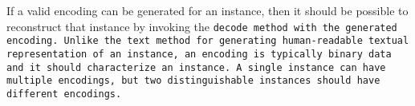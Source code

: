 If a valid encoding can be generated for an instance,
then it should be possible to reconstruct that instance by
invoking the \tt{decode} method with the generated encoding.
Unlike the \tt{text} method for generating human-readable
textual representation of an instance, an encoding is
typically binary data and it should characterize an instance.
A single instance can have multiple encodings, but two
distinguishable instances should have different encodings.
